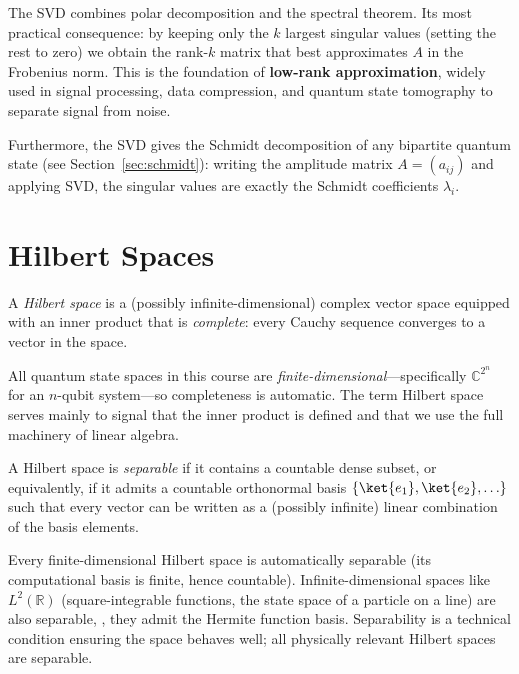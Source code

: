 \documentclass[oneside]{academica}
\begin{document}
The SVD combines polar decomposition and the spectral theorem.
Its most practical consequence: by keeping only the $k$ largest singular values (setting the rest to zero) we obtain the rank-$k$ matrix that best approximates $A$ in the Frobenius norm.
This is the foundation of \textbf{low-rank approximation}, widely used in signal processing, data compression, and quantum state tomography to separate signal from noise.

Furthermore, the SVD gives the Schmidt decomposition of any bipartite quantum state (see Section~\ref{sec:schmidt}): writing the amplitude matrix $A=(a_{ij})$ and applying SVD, the singular values are exactly the Schmidt coefficients $\lambda_i$.

\section{Hilbert Spaces}

\begin{definition*}
  A \emph{Hilbert space} is a (possibly infinite-dimensional) complex vector space equipped with an inner product that is \emph{complete}: every Cauchy sequence converges to a vector in the space.
\end{definition*}

All quantum state spaces in this course are \emph{finite-dimensional}---specifically $\mathbb{C}^{2^n}$ for an $n$-qubit system---so completeness is automatic.
The term Hilbert space serves mainly to signal that the inner product is defined and that we use the full machinery of linear algebra.

\begin{definition*}
  A Hilbert space is \emph{separable} if it contains a countable dense subset, or equivalently, if it admits a countable orthonormal basis $\{\ket{e_1},\ket{e_2},\ldots\}$ such that every vector can be written as a (possibly infinite) linear combination of the basis elements.
\end{definition*}

Every finite-dimensional Hilbert space is automatically separable (its computational basis is finite, hence countable).
Infinite-dimensional spaces like $L^2(\mathbb{R})$ (square-integrable functions, the state space of a particle on a line) are also separable, \ie, they admit the Hermite function basis.
Separability is a technical condition ensuring the space behaves well; all physically relevant Hilbert spaces are separable.
\end{document}
